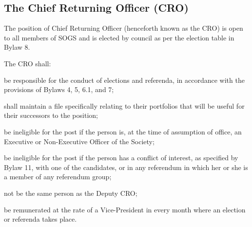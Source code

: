 \subsection {The Chief Returning Officer (CRO)}
\begin{longenum}[ label*=\thesubsection.\arabic*., align=left]
	\item The position of Chief Returning Officer (henceforth known as the CRO) is open to all members of SOGS and is elected by council as per the election table in Bylaw 8.
    \item The CRO shall: 
    \begin{longenum}[ label*=\arabic*., align=left]
		\item  be responsible for the conduct of elections and referenda, in accordance with the provisions of Bylaws 4, 5, 6.1, and 7; 
		\item shall maintain a file specifically relating to their portfolios that will be useful for their successors to the position; 
        \item be ineligible for the post if the person is, at the time of assumption of office, an Executive or Non-Executive Officer of the Society; 

        \item be ineligible for the post if the person has a conflict of interest, as specified by Bylaw 11, with one of the candidates, or in any referendum in which her or she is a member of any referendum group;
        \item not be the same person as the Deputy CRO;
        \item be remunerated at the rate of a Vice-President in every month where an election or referenda takes place. 
        \end{longenum}
\end{longenum}
